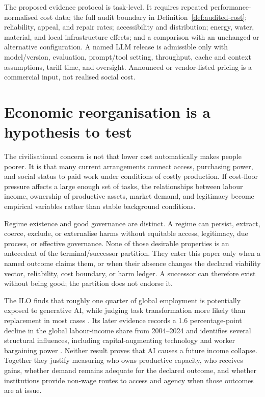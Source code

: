 \documentclass[11pt]{article}
\begin{document}
The proposed evidence protocol is task-level. It requires repeated
performance-normalised cost data; the full audit boundary in Definition~\ref{def:audited-cost};
reliability, appeal, and repair rates; accessibility and distribution; energy,
water, material, and local infrastructure effects; and a comparison with an
unchanged or alternative configuration. A named LLM release is admissible only
with model/version, evaluation, prompt/tool setting, throughput, cache and
context assumptions, tariff time, and oversight. Announced or vendor-listed
pricing is a commercial input, not realised social cost.

\section{Economic reorganisation is a hypothesis to test}\label{sec:economy}

The civilisational concern is not that lower cost automatically makes people
poorer. It is that many current arrangements connect access, purchasing power,
and social status to paid work under conditions of costly production. If
cost-floor pressure affects a large enough set of tasks, the relationships
between labour income, ownership of productive assets, market demand, and
legitimacy become empirical variables rather than stable background conditions.

Regime existence and good governance are distinct. A regime can persist,
extract, coerce, exclude, or externalise harms without equitable access,
legitimacy, due process, or effective governance. None of those desirable
properties is an antecedent of the terminal/successor partition. They enter this
paper only when a named outcome claims them, or when their absence changes the
declared viability vector, reliability, cost boundary, or harm ledger. A
successor can therefore exist without being good; the partition does not
endorse it.

The ILO finds that roughly one quarter of global employment is potentially
exposed to generative AI, while judging task transformation more likely than
replacement in most cases \citep{ilo2023}. Its later evidence records a 1.6
percentage-point decline in the global labour-income share from 2004--2024 and
identifies several structural influences, including capital-augmenting
technology and worker bargaining power \citep{ilo2025}. Neither result proves
that AI causes a future income collapse. Together they justify measuring who
owns productive capacity, who receives gains, whether demand remains adequate
for the declared outcome, and whether institutions provide non-wage routes to
access and agency when those outcomes are at issue.
\end{document}
